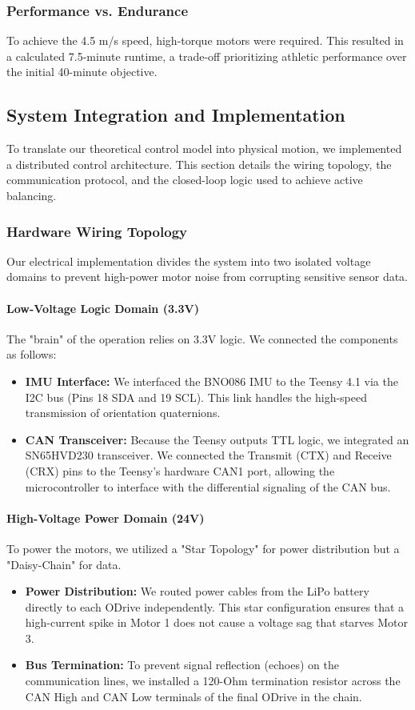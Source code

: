 \documentclass[12pt]{article}
\begin{document}
\subsubsection{Performance vs. Endurance}
To achieve the 4.5 m/s speed, high-torque motors were required. This resulted in a calculated 7.5-minute runtime, a trade-off prioritizing athletic performance over the initial 40-minute objective.

\subsection{System Integration and Implementation}
To translate our theoretical control model into physical motion, we implemented a distributed control architecture. This section details the wiring topology, the communication protocol, and the closed-loop logic used to achieve active balancing.

\subsubsection{Hardware Wiring Topology}
Our electrical implementation divides the system into two isolated voltage domains to prevent high-power motor noise from corrupting sensitive sensor data.

\paragraph{Low-Voltage Logic Domain (3.3V)}
The "brain" of the operation relies on 3.3V logic. We connected the components as follows:
\begin{itemize}
    \item \textbf{IMU Interface:} We interfaced the BNO086 IMU to the Teensy 4.1 via the I2C bus (Pins 18 SDA and 19 SCL). This link handles the high-speed transmission of orientation quaternions.
    \item \textbf{CAN Transceiver:} Because the Teensy outputs TTL logic, we integrated an SN65HVD230 transceiver. We connected the Transmit (CTX) and Receive (CRX) pins to the Teensy's hardware CAN1 port, allowing the microcontroller to interface with the differential signaling of the CAN bus.
\end{itemize}

\paragraph{High-Voltage Power Domain (24V)}
To power the motors, we utilized a "Star Topology" for power distribution but a "Daisy-Chain" for data.
\begin{itemize}
    \item \textbf{Power Distribution:} We routed power cables from the LiPo battery directly to each ODrive independently. This star configuration ensures that a high-current spike in Motor 1 does not cause a voltage sag that starves Motor 3.
    \item \textbf{Bus Termination:} To prevent signal reflection (echoes) on the communication lines, we installed a 120-Ohm termination resistor across the CAN High and CAN Low terminals of the final ODrive in the chain.
\end{itemize}
\end{document}
